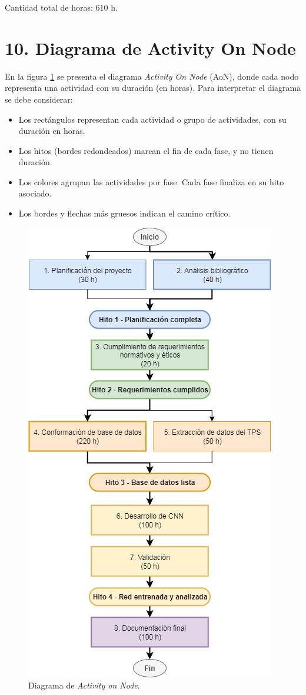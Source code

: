 \documentclass[
11pt, %
codirector, %
]{charter}
\begin{document}
Cantidad total de horas: 610 h.

\section{10. Diagrama de Activity On Node}
\label{sec:AoN}

En la figura \ref{fig:AoN} se presenta el diagrama \textit{Activity On Node} (AoN), donde cada nodo representa una actividad con su duración (en horas). Para interpretar el diagrama se debe considerar:
\begin{itemize}
	\item Los rectángulos representan cada actividad o grupo de actividades, con su duración en horas.
	\item Los hitos (bordes redondeados) marcan el fin de cada fase, y no tienen duración.
	\item Los colores agrupan las actividades por fase. Cada fase finaliza en su hito asociado.
	\item Los bordes y flechas más gruesos indican el camino crítico.
\end{itemize}

\begin{figure}[H]
\centering 
\includegraphics[width=.65\textwidth]{./Figuras/ActivityOnNode.png}
\caption{Diagrama de \textit{Activity on Node}.}
\label{fig:AoN}
\end{figure}
\end{document}
